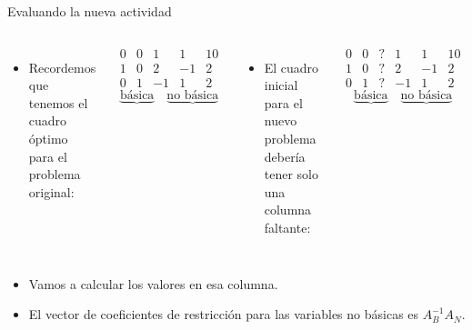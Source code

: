 \documentclass{beamer}
\begin{document}
\begin{frame}{Evaluando la nueva actividad}
    \begin{columns}
        \begin{itemize}
            \item Recordemos que tenemos el cuadro óptimo para el problema original:
        \end{itemize}

        \[
        \begin{array}{cccc|c}
            0 & 0 & 1 & 1 & 10 \\
            \hline
            1 & 0 & 2 & -1 & 2 \\
            0 & 1 & -1 & 1 & 2
        \end{array}
        \]
        \[
        \underbrace{\text{básica}}_{\phantom{a}} \quad
        \underbrace{\text{no básica}}
        \]

        \begin{itemize}
            \item El cuadro inicial para el nuevo problema debería tener solo una columna faltante:
        \end{itemize}

        \[
        \begin{array}{ccccc|c}
            0 & 0 & ? & 1 & 1 & 10 \\
            \hline
            1 & 0 & ? & 2 & -1 & 2 \\
            0 & 1 & ? & -1 & 1 & 2
        \end{array}
        \]
        \[
        \underbrace{\text{básica}}_{\phantom{a}} \quad
        \underbrace{\text{no básica}}
        \]
    \end{columns}
        \begin{itemize}
        \item Vamos a calcular los valores en esa columna.
        \item El vector de coeficientes de restricción para las variables no básicas es \( A_B^{-1} A_N \).
\end{itemize}
\end{frame}
\end{document}
